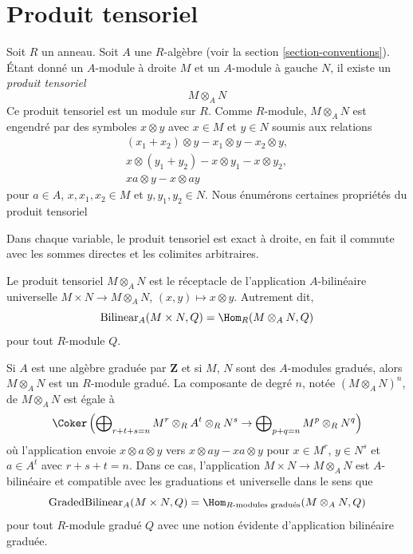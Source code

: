 \section{Produit tensoriel}
\label{section-tensor-product}

\noindent
Soit $R$ un anneau. Soit $A$ une $R$-algèbre (voir la
section \ref{section-conventions}). Étant donné un $A$-module à droite $M$ et
un $A$-module à gauche $N$, il existe un {\it produit tensoriel}
$$
M \otimes_A N
$$
Ce produit tensoriel est un module sur $R$. Comme $R$-module, $M \otimes_A
N$ est engendré par des symboles $x \otimes y$ avec $x \in M$ et $y \in N$
soumis aux relations
$$
\begin{matrix}
(x_1 + x_2) \otimes y - x_1 \otimes y - x_2 \otimes y, \\
x \otimes (y_1 + y_2) - x \otimes y_1 - x \otimes y_2, \\
xa \otimes y - x \otimes ay
\end{matrix}
$$
pour $a \in A$, $x, x_1, x_2 \in M$ et $y, y_1, y_2 \in N$. Nous
énumérons certaines propriétés du produit tensoriel

\medskip\noindent
Dans chaque variable, le produit tensoriel est exact à droite, en fait il commute
avec les sommes directes et les colimites arbitraires.

\medskip\noindent
Le produit tensoriel $M \otimes_A N$ est le réceptacle de l'application
$A$-bilinéaire universelle $M \times N \to M \otimes_A N$, $(x, y) \mapsto x \otimes y$.
Autrement dit,
$$
\text{Bilinear}_A(M \times N, Q) = \Hom_R(M \otimes_A N, Q)
$$
pour tout $R$-module $Q$.

\medskip\noindent
Si $A$ est une algèbre graduée par $\mathbf{Z}$ et si $M$, $N$ sont des
$A$-modules gradués, alors $M \otimes_A N$ est un $R$-module gradué.
La composante de degré $n$, notée $(M \otimes_A N)^n$, de $M \otimes_A N$
est égale à
$$
\Coker\left(
\bigoplus\nolimits_{r + t + s = n}
M^r \otimes_R A^t \otimes_R N^s \to
\bigoplus\nolimits_{p + q = n} M^p \otimes_R N^q
\right)
$$
où l'application envoie $x \otimes a \otimes y$
vers $x \otimes ay - xa \otimes y$ pour
$x \in M^r$, $y \in N^s$ et $a \in A^t$ avec $r + s + t = n$. Dans
ce cas, l'application $M \times N \to M \otimes_A N$ est $A$-bilinéaire et
compatible avec les graduations et universelle dans le sens que
$$
\text{GradedBilinear}_A(M \times N, Q) =
\Hom_{\text{}R\text{-modules gradués}}(M \otimes_A N, Q)
$$
pour tout $R$-module gradué $Q$ avec une notion évidente d'application
bilinéaire graduée.

